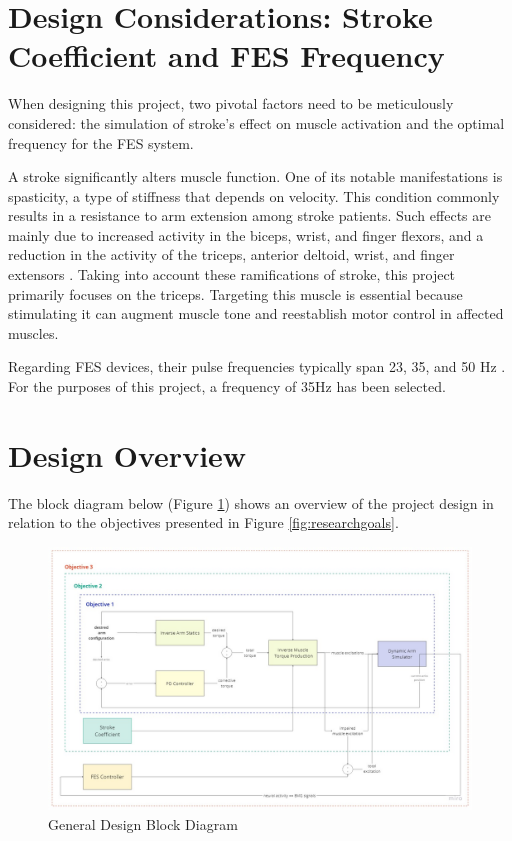 \section{Design Considerations: Stroke Coefficient and FES Frequency}

When designing this project, two pivotal factors need to be meticulously considered: the simulation of stroke's effect on muscle activation and the optimal frequency for the FES system.

A stroke significantly alters muscle function. One of its notable manifestations is spasticity, a type of stiffness that depends on velocity. This condition commonly results in a resistance to arm extension among stroke patients. Such effects are mainly due to increased activity in the biceps, wrist, and finger flexors, and a reduction in the activity of the triceps, anterior deltoid, wrist, and finger extensors \cite{IOL}. Taking into account these ramifications of stroke, this project primarily focuses on the triceps. Targeting this muscle is essential because stimulating it can augment muscle tone and reestablish motor control in affected muscles.

Regarding FES devices, their pulse frequencies typically span 23, 35, and 50 Hz \cite{NNPID}. For the purposes of this project, a frequency of 35Hz has been selected.

\section{Design Overview}
The block diagram below (Figure \ref{fig:bdd}) shows an overview of the project design in relation to the objectives presented in Figure \ref{fig:researchgoals}.

\begin{figure}[h!]
    \centering
    \includegraphics[width=\textwidth]{Pictures/blockDiagram.jpg}
    \caption{General Design Block Diagram}
    \label{fig:bdd}
\end{figure}

